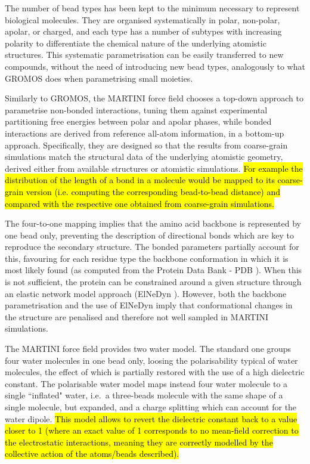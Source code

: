 The number of bead types has been kept to the minimum necessary to represent biological molecules. They are organised systematically in polar, non-polar, apolar, or charged, and each type has a number of subtypes with increasing polarity to differentiate the chemical nature of the underlying atomistic structures.
%
This systematic parametrisation can be easily transferred to new compounds, without the need of introducing new bead types, analogously to what GROMOS does when parametrising small moieties.

Similarly to GROMOS, the MARTINI force field chooses a top-down approach to parametrise non-bonded interactions, tuning them against experimental partitioning free energies between polar and apolar phases, while bonded interactions are derived from reference all-atom information, in a bottom-up approach.
%
Specifically, they are designed so that the results from coarse-grain simulations match the structural data of the underlying atomistic geometry, derived either from available structures or atomistic simulations. \hl{For example the distribution of the length of a bond in a molecule would be mapped to its coarse-grain version (i.e. computing the corresponding bead-to-bead distance) and compared with the respective one obtained from coarse-grain simulations.}

The four-to-one mapping implies that the amino acid backbone is represented by one bead only, preventing the description of directional bonds which are key to reproduce the secondary structure. The bonded parameters partially account for this, favouring for each residue type the backbone conformation in which it is most likely found (as computed from the Protein Data Bank - PDB \cite{PDB}). When this is not sufficient, the protein can be constrained around a given structure through an elastic network model approach (ElNeDyn \cite{Periole2009}). However, both the backbone parametrisation and the use of ElNeDyn imply that conformational changes in the structure are penalised and therefore not well sampled in MARTINI simulations.

The MARTINI force field provides two water model. The standard one groups four water molecules in one bead only, loosing the polarisability typical of water molecules, the effect of which is partially restored with the use of a high dielectric constant. The polarisable water model \cite{Yesylevskyy2010} maps instead four water molecule to a single ``inflated" water, i.e.\ a three-beads molecule with the same shape of a single molecule, but expanded, and a charge splitting which can account for the water dipole. \hl{This model allows to revert the dielectric constant back to a value closer to 1 (where an exact value of 1 corresponds to no mean-field correction to the electrostatic interactions, meaning they are correctly modelled by the collective action of the atoms/beads described).}

